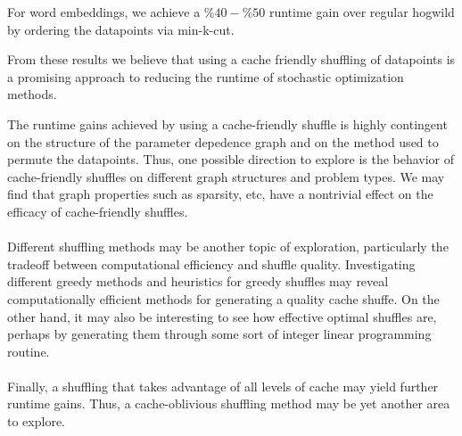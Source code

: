\documentclass[times,11pt]{article}
\numberwithin{equation}{section}		%
\numberwithin{figure}{section}			%
\numberwithin{table}{section}				%
\begin{document}

For word embeddings, we achieve a $\%40-\%50$ runtime gain over regular hogwild by ordering the datapoints via min-k-cut.

From these results we believe that using a cache friendly shuffling of datapoints is a promising approach to reducing the runtime of stochastic optimization methods.

The runtime gains achieved by using a cache-friendly shuffle is highly
contingent on the structure of the parameter depedence graph and on
the method used to permute the datapoints. Thus, one possible
direction to explore is the behavior of cache-friendly shuffles on
different graph structures and problem types. We may find that graph
properties such as sparsity, etc, have a nontrivial effect on the
efficacy of cache-friendly shuffles.
\\\\
Different shuffling methods may be another topic of exploration, particularly
the tradeoff between computational efficiency and shuffle
quality. Investigating different greedy methods and heuristics for
greedy shuffles may reveal computationally efficient methods for
generating a quality cache shuffe. On the other hand, it may also be
interesting to see how effective optimal shuffles are, perhaps by
generating them through some sort of integer linear programming
routine.
\\\\
Finally, a shuffling that takes advantage of all levels of cache may yield further runtime gains.
Thus, a cache-oblivious shuffling method may be yet another area to explore.
\end{document}
